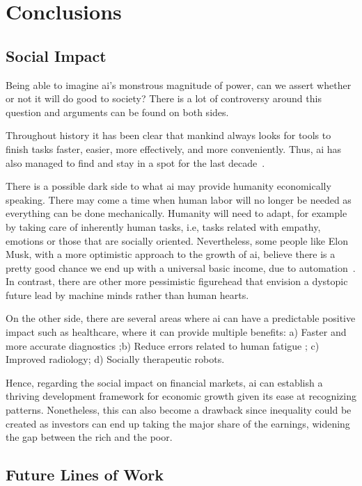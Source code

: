 \chapter{Conclusions}

\section{Social Impact}
\label{imp:impacto}

Being able to imagine \gls{ai}'s monstrous magnitude of power, can we assert whether or not it will do good to society? There is a lot of controversy around this question and arguments can be found on both sides.

Throughout history it has been clear that mankind always looks for tools to finish tasks faster, easier, more effectively, and more conveniently. Thus, \gls{ai} has also managed to find and stay in a spot for the last decade~\cite{tai2020impact}.

There is a possible dark side to what \gls{ai} may provide humanity economically speaking. There may come a time when human labor will no longer be needed as everything can be done mechanically. Humanity will need to adapt, for example by taking care of inherently human tasks, i.e, tasks related with empathy, emotions or those that are socially oriented. Nevertheless, some people like Elon Musk, with a more optimistic approach to the growth of \gls{ai}, believe there is a pretty good chance we end up with a universal basic income, due to automation~\cite{elonBasicIncome}. In contrast, there are other more pessimistic figurehead that envision a dystopic future lead by machine minds rather than human hearts.

On the other side, there are several areas where \gls{ai} can have a predictable positive impact such as healthcare, where it can provide multiple benefits: a) Faster and more accurate diagnostics ;b) Reduce errors related to human fatigue ; c) Improved radiology; d) Socially therapeutic robots.

Hence, regarding the social impact on financial markets, \gls{ai} can establish a thriving development framework for economic growth given its ease at recognizing patterns. Nonetheless, this can also become a drawback since inequality could be created as investors can end up taking the major share of the earnings, widening the gap between the rich and the poor.

\section{Future Lines of Work}
\label{fu:future}

